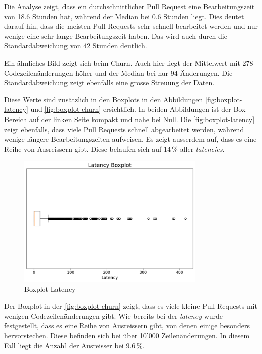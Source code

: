 Die Analyse zeigt, dass ein durchschnittlicher Pull Request eine Bearbeitungszeit von 18.6 Stunden hat, während der Median bei 0.6 Stunden liegt. Dies deutet darauf hin, dass die meisten Pull-Requests sehr schnell bearbeitet werden und nur wenige eine sehr lange Bearbeitungszeit haben. Das wird auch durch die Standardabweichung von 42 Stunden deutlich.

Ein ähnliches Bild zeigt sich beim Churn. Auch hier liegt der Mittelwert mit 278 Codezeilenänderungen höher und der Median bei nur 94 Änderungen. Die Standardabweichung zeigt ebenfalls eine grosse Streuung der Daten.

Diese Werte sind zusätzlich in den Boxplots in den Abbildungen \autoref{fig:boxplot-latency} und \autoref{fig:boxplot-churn} ersichtlich. 
In beiden Abbildungen ist der Box-Bereich auf der linken Seite kompakt und nahe bei Null. 
Die \autoref{fig:boxplot-latency} zeigt ebenfalls, dass viele Pull Requests schnell abgearbeitet werden, während wenige längere Bearbeitungszeiten aufweisen. Es zeigt ausserdem auf, dass es eine Reihe von Ausreissern gibt. Diese belaufen sich auf 14\,\% aller \textit{latencies}.

\begin{figure}[htbp]
    \includegraphics[width=0.8\textwidth]{Figures/boxplot-latency.png}
    \centering
    \caption{Boxplot Latency}
    \label{fig:boxplot-latency}
\end{figure}
 \newpage
Der Boxplot in der \autoref{fig:boxplot-churn} zeigt, dass es viele kleine Pull Requests mit wenigen Codezeilenänderungen gibt. Wie bereits bei der \textit{latency} wurde festgestellt, dass es eine Reihe von Ausreissern gibt, von denen einige besonders hervorstechen. Diese befinden sich bei über 10'000 Zeilenänderungen. In diesem Fall liegt die Anzahl der Ausreisser bei 9.6\,\%.

